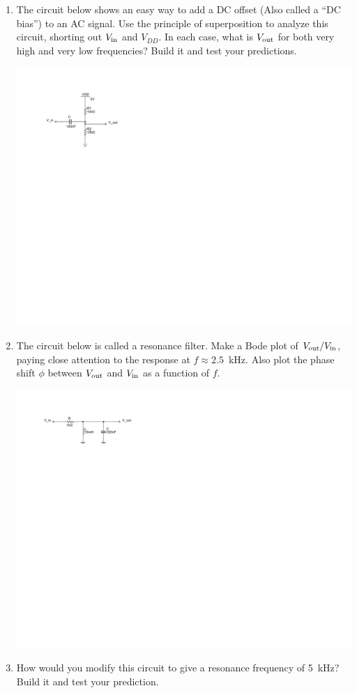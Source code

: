 \begin{enumerate}[wide]
\item The circuit below shows an easy way to add a DC offset (Also called a ``DC bias'') to an AC signal.  Use the principle of superposition to analyze this circuit, shorting out $V_{\rm in}$ and $V_{DD}$.  In each case, what is $V_{\rm out}$ for both very high and very low frequencies?  Build it and test your predictions. \label{part_DC_bias}
\begin{center}
\includegraphics{filters/DC_biasing.pdf}
\end{center}

\item The circuit below is called a resonance filter.  Make a Bode plot of $V_{\rm out}/V_{\rm in}$, paying close attention to the response at $f \approx 2.5$~kHz.  Also plot the phase shift $\phi$ between $V_{\rm out}$ and $V_{\rm in}$ as a function of $f$. 
\label{part_resonance_filter}
\begin{center}
\includegraphics{filters/LC_resonance_filter.pdf}
\end{center}

\item How would you modify this circuit to give a resonance frequency of 5~kHz?   Build it and test your prediction.


\end{enumerate}

